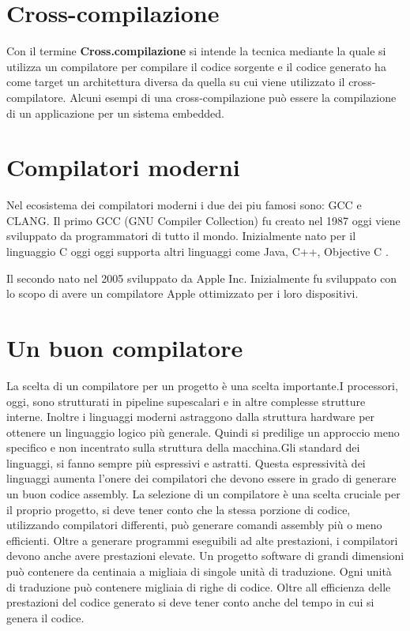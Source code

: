 \documentclass[12pt,a4paper]{report}
\begin{document}
\section{Cross-compilazione}
\label{Sec:Cross}
Con il termine \textbf{Cross.compilazione} si intende la tecnica mediante la quale si utilizza un compilatore per compilare il codice sorgente e il codice generato ha come target un architettura diversa da quella su cui viene utilizzato il cross-compilatore.  Alcuni esempi di una cross-compilazione può essere la compilazione di un applicazione per un sistema embedded. 


\section{Compilatori moderni}
Nel ecosistema dei compilatori moderni i due dei piu famosi sono: GCC e CLANG.
Il primo GCC (GNU Compiler Collection) fu creato nel 1987 oggi viene sviluppato da programmatori di tutto il mondo. Inizialmente nato per il linguaggio C oggi oggi supporta altri linguaggi come Java, C++, Objective C \cite{GCCstory}.

Il secondo nato nel 2005 sviluppato da Apple Inc.  Inizialmente fu sviluppato con lo scopo di avere un compilatore Apple ottimizzato per i loro dispositivi\cite{ClangStory}.

\section{Un buon compilatore} %
La scelta di un compilatore per un progetto è una scelta importante.I processori, oggi, sono strutturati in pipeline supescalari e in altre complesse strutture interne. Inoltre i linguaggi moderni astraggono dalla struttura hardware per ottenere un linguaggio logico più generale. Quindi si predilige un approccio meno specifico e non incentrato sulla struttura della macchina.Gli standard dei linguaggi, si fanno  sempre più espressivi e astratti.  Questa espressività dei linguaggi aumenta l'onere dei compilatori che devono essere in grado di generare un buon codice assembly. La selezione di un compilatore è una scelta cruciale per il proprio progetto, si deve tener conto che la stessa porzione di codice, utilizzando compilatori differenti, può generare comandi assembly più o meno efficienti.
Oltre a generare programmi eseguibili ad alte prestazioni, i compilatori devono anche avere prestazioni elevate. Un progetto software di grandi dimensioni  può contenere da centinaia a migliaia di singole unità di traduzione. Ogni unità di traduzione può contenere migliaia di righe di codice.  Oltre all efficienza delle prestazioni del codice generato si deve tener conto anche del tempo in cui si genera il codice.
\end{document}
